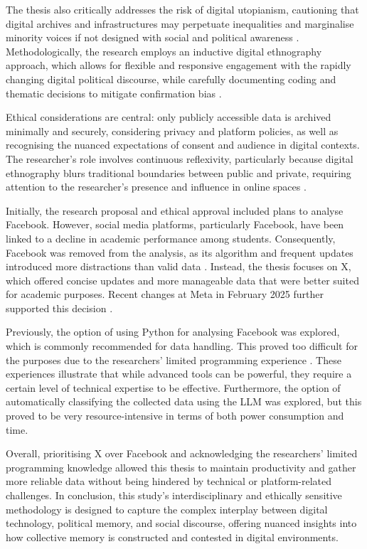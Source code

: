 The thesis also critically addresses the risk of digital utopianism, cautioning that digital archives and infrastructures may perpetuate inequalities and marginalise minority voices if not designed with social and political awareness \citep{van_house_technologies_2008}. Methodologically, the research employs an inductive digital ethnography approach, which allows for flexible and responsive engagement with the rapidly changing digital political discourse, while carefully documenting coding and thematic decisions to mitigate confirmation bias \citep{day_finding_2019}.

Ethical considerations are central: only publicly accessible data is archived minimally and securely, considering privacy and platform policies, as well as recognising the nuanced expectations of consent and audience in digital contexts. The researcher's role involves continuous reflexivity, particularly because digital ethnography blurs traditional boundaries between public and private, requiring attention to the researcher's presence and influence in online spaces \citep{matthes_digital_2017}.

Initially, the research proposal and ethical approval included plans to analyse Facebook. However, social media platforms, particularly Facebook, have been linked to a decline in academic performance among students. Consequently, Facebook was removed from the analysis, as its algorithm and frequent updates introduced more distractions than valid data \citep{minds2lead2025meta}. Instead, the thesis focuses on X, which offered concise updates and more manageable data that were better suited for academic purposes. Recent changes at Meta in February 2025 further supported this decision \citep{kasanmascheff2025meta}.

Previously, the option of using Python for analysing Facebook was explored, which is commonly recommended for data handling. This proved too difficult for the purposes due to the researchers' limited programming experience \citep{minds2lead2025meta}. These experiences illustrate that while advanced tools can be powerful, they require a certain level of technical expertise to be effective. Furthermore, the option of automatically classifying the collected data using the LLM was explored, but this proved to be very resource-intensive in terms of both power consumption and time.

 Overall, prioritising X over Facebook and acknowledging the researchers' limited programming knowledge allowed this thesis to maintain productivity and gather more reliable data without being hindered by technical or platform-related challenges. In conclusion, this study's interdisciplinary and ethically sensitive methodology is designed to capture the complex interplay between digital technology, political memory, and social discourse, offering nuanced insights into how collective memory is constructed and contested in digital environments.

\vfill